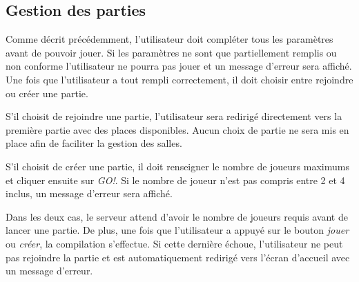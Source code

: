 	\subsection{Gestion des parties}
		Comme décrit précédemment, l'utilisateur doit compléter tous les paramètres avant de pouvoir jouer. Si les paramètres ne sont que partiellement remplis ou non conforme l'utilisateur ne pourra pas jouer et un message d'erreur sera affiché. Une fois que l'utilisateur a tout rempli correctement, il doit choisir entre rejoindre ou créer une partie.

		S'il choisit de rejoindre une partie, l'utilisateur sera redirigé directement vers la première partie avec des places disponibles. Aucun choix de partie ne sera mis en place afin de faciliter la gestion des salles.

		S'il choisit de créer une partie, il doit renseigner le nombre de joueurs maximums et cliquer ensuite sur \textit{GO!}. Si le nombre de joueur n'est pas compris entre 2 et 4 inclus, un message d'erreur sera affiché.

		Dans les deux cas, le serveur attend d'avoir le nombre de joueurs requis avant de lancer une partie. De plus, une fois que l'utilisateur a appuyé sur le bouton \textit{jouer} ou \textit{créer}, la compilation s'effectue. Si cette dernière échoue, l'utilisateur ne peut pas rejoindre la partie et est automatiquement redirigé vers l'écran d'accueil avec un message d'erreur.


